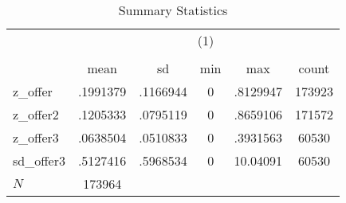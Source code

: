 \begin{table}[htbp]\centering
\def\sym#1{\ifmmode^{#1}\else\(^{#1}\)\fi}
\caption{Summary Statistics}
\begin{tabular}{l*{1}{ccccc}}
\hline\hline
            &\multicolumn{5}{c}{(1)}                                         \\
            &\multicolumn{5}{c}{}                                            \\
            &        mean&          sd&         min&         max&       count\\
\hline
z\_offer     &    .1991379&    .1166944&           0&    .8129947&      173923\\
z\_offer2    &    .1205333&    .0795119&           0&    .8659106&      171572\\
z\_offer3    &    .0638504&    .0510833&           0&    .3931563&       60530\\
sd\_offer3   &    .5127416&    .5968534&           0&    10.04091&       60530\\
\hline
\(N\)       &      173964&            &            &            &            \\
\hline\hline
\end{tabular}
\end{table}
